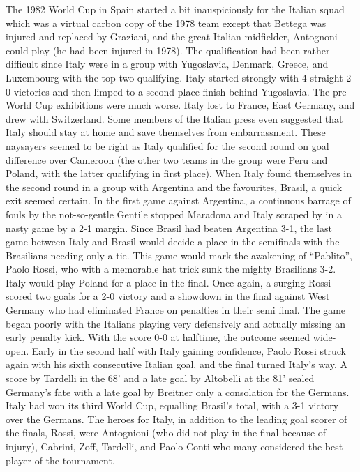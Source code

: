 The 1982 World Cup in Spain started a bit inauspiciously for the Italian squad 
which was a virtual carbon copy of the 1978 team except that Bettega was 
injured and replaced by Graziani, and the great Italian midfielder, Antognoni 
could play (he had been injured in 1978). The qualification had been rather 
difficult since Italy were in a group with Yugoslavia, Denmark, Greece, and 
Luxembourg with the top two qualifying. Italy started strongly with 4 straight 
2-0 victories and then limped to a second place finish behind Yugoslavia. The 
pre-World Cup exhibitions were much worse. Italy lost to France, East Germany, 
and drew with Switzerland. Some members of the Italian press even suggested 
that Italy should stay at home and save themselves from embarrassment. These 
naysayers seemed to be right as Italy qualified for the second round on goal 
difference over Cameroon (the other two teams in the group were Peru and Poland,
with the latter qualifying in first place). When Italy found themselves in the 
second round in a group with Argentina and the favourites, Brasil, a quick exit
seemed certain. In the first game against Argentina, a continuous barrage of 
fouls by the not-so-gentle Gentile stopped Maradona and Italy scraped by in a 
nasty game by a 2-1 margin. Since Brasil had beaten Argentina 3-1, the last
game between Italy and Brasil would decide a place in the semifinals with
the Brasilians needing only a tie. This game would mark the awakening of 
``Pablito'', Paolo Rossi, who with a memorable hat trick sunk the mighty 
Brasilians 3-2. Italy would play Poland for a place in the final. Once again, a
surging Rossi scored two goals for a 2-0 victory and a showdown in the final 
against West Germany who had eliminated France on penalties in their semi final.
The game began poorly with the Italians playing very defensively and actually
missing an early penalty kick. With the score 0-0 at halftime, the outcome 
seemed wide-open. Early in the second half with Italy gaining confidence, Paolo
Rossi struck again with his sixth consecutive Italian goal, and the final 
turned Italy's way. A score by Tardelli in the 68' and a late goal by Altobelli
at the 81' sealed Germany's fate with a late goal by Breitner only a consolation
for the Germans. Italy had won its third World Cup, equalling Brasil's total,
with a 3-1 victory over the Germans.  The heroes for Italy, in addition to the 
leading goal scorer of the finals, Rossi, were Antognioni (who did not play in 
the final because of injury), Cabrini, Zoff, Tardelli, and Paolo Conti who many
considered the best player of the tournament.

